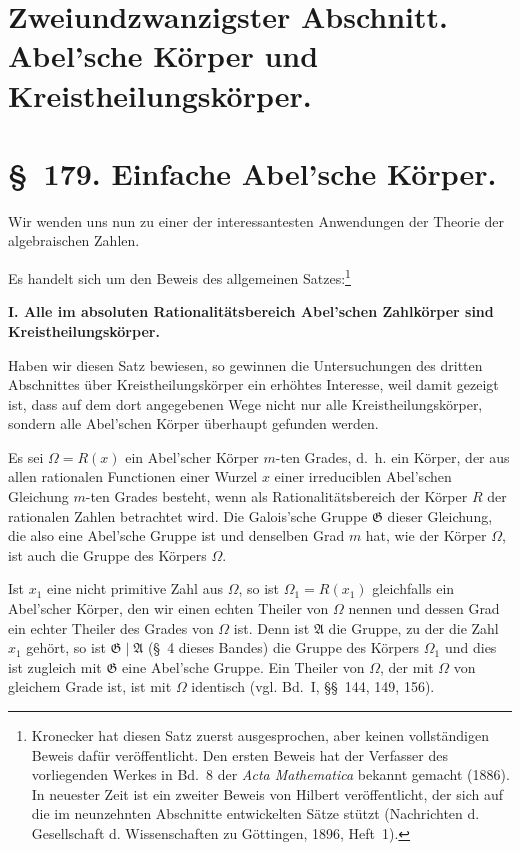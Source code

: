 \documentclass[11pt]{article}
\newcommand{\Om}{\Omega}
\newcommand{\Gg}{\mathfrak G}
\newcommand{\Aa}{\mathfrak A}
\begin{document}
\section*{Zweiundzwanzigster Abschnitt. Abel'sche Körper und Kreistheilungskörper.}

\section*{\S~179. Einfache Abel'sche Körper.}

Wir wenden uns nun zu einer der interessantesten Anwendungen der Theorie der algebraischen Zahlen.

Es handelt sich um den Beweis des allgemeinen Satzes:\footnote{Kronecker hat diesen Satz zuerst ausgesprochen, aber keinen vollständigen Beweis dafür veröffentlicht. Den ersten Beweis hat der Verfasser des vorliegenden Werkes in Bd.~8 der \textit{Acta Mathematica} bekannt gemacht (1886). In neuester Zeit ist ein zweiter Beweis von Hilbert veröffentlicht, der sich auf die im neunzehnten Abschnitte entwickelten Sätze stützt (Nachrichten d. Gesellschaft d. Wissenschaften zu Göttingen, 1896, Heft~1).}

\textbf{I. Alle im absoluten Rationalitätsbereich Abel'schen Zahlkörper sind Kreistheilungskörper.}

Haben wir diesen Satz bewiesen, so gewinnen die Untersuchungen des dritten Abschnittes über Kreistheilungskörper ein erhöhtes Interesse, weil damit gezeigt ist, dass auf dem dort angegebenen Wege nicht nur alle Kreistheilungskörper, sondern alle Abel'schen Körper überhaupt gefunden werden.

Es sei $\Om=R(x)$ ein Abel'scher Körper $m$-ten Grades, d.~h. ein Körper, der aus allen rationalen Functionen einer Wurzel $x$ einer irreduciblen Abel'schen Gleichung $m$-ten Grades besteht, wenn als Rationalitätsbereich der Körper $R$ der rationalen Zahlen betrachtet wird. Die Galois'sche Gruppe $\Gg$ dieser Gleichung, die also eine Abel'sche Gruppe ist und denselben Grad $m$ hat, wie der Körper $\Om$, ist auch die Gruppe des Körpers $\Om$.

Ist $x_1$ eine nicht primitive Zahl aus $\Om$, so ist $\Om_1=R(x_1)$ gleichfalls ein Abel'scher Körper, den wir einen echten Theiler von $\Om$ nennen und dessen Grad ein echter Theiler des Grades von $\Om$ ist. Denn ist $\Aa$ die Gruppe, zu der die Zahl $x_1$ gehört, so ist $\Gg\mid\Aa$ (\S~4 dieses Bandes) die Gruppe des Körpers $\Om_1$ und dies ist zugleich mit $\Gg$ eine Abel'sche Gruppe. Ein Theiler von $\Om$, der mit $\Om$ von gleichem Grade ist, ist mit $\Om$ identisch (vgl. Bd.~I, \S\S~144, 149, 156).
\end{document}
